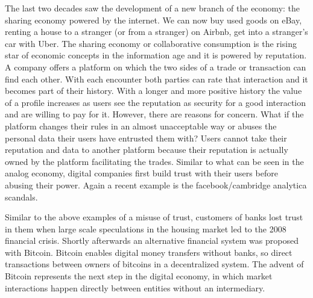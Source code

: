 The last two decades saw the development of a new branch of the economy: the sharing economy powered
by the internet. We can now buy used goods on eBay, renting a house to a stranger (or from a 
stranger) on Airbnb, get into a stranger's car with Uber. The sharing economy or collaborative consumption is the 
rising star of economic concepts in the information age and it is powered by reputation. A company 
offers a platform on which the two sides of a trade or transaction can find each other. With each 
encounter both parties can rate that interaction and it becomes part of their history. With a longer
and more positive history the value of a profile increases as users see the reputation as security
for a good interaction and are willing to pay for it. However, there are reasons for concern. What
if the platform changes their rules in an almost unacceptable way or abuses the personal data their
users have entrusted them with? Users cannot take their reputation and data to another platform
because their reputation is actually owned by the platform facilitating the trades. Similar to what
can be seen in the analog economy, digital companies first build trust with their users before 
abusing their power. Again a recent example is the facebook/cambridge analytica scandals.~\cite{facebook} 


Similar to the above examples of a misuse of trust, customers of banks lost trust in them when large
scale speculations in the housing market led to the 2008 financial crisis\cite{financial_crisis}. 
Shortly afterwards an alternative financial system was proposed with Bitcoin\cite{nakamoto2008bitcoin}.
Bitcoin enables digital money transfers without banks, so direct transactions between owners of 
bitcoins in a decentralized system. The advent of Bitcoin represents the next step in the digital
economy, in which market interactions happen directly between entities without an intermediary.




